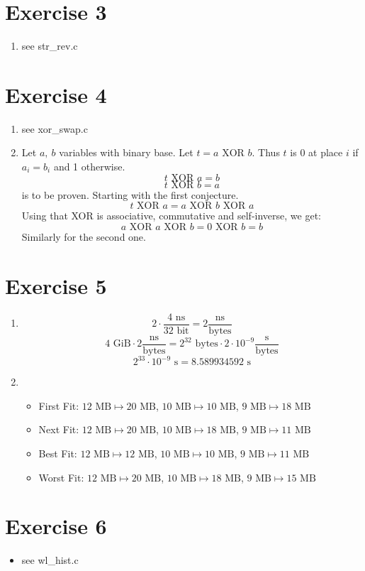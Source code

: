 \documentclass[a4paper,10pt]{article}
\begin{document}
\section*{Exercise 3}
\begin{enumerate}
 \item see str\_rev.c
\end{enumerate}

\section*{Exercise 4}
\begin{enumerate}
 \item see xor\_swap.c
 \item Let $a,\ b$ variables with binary base. Let $t = a \text{ XOR } b$. Thus $t$ is $0$ at place $i$ if $a_i = b_i$ and 1 otherwise. \\
 \[ t \text{ XOR } a = b \]
 \[ t \text{ XOR } b = a \]
 is to be proven. Starting with the first conjecture.
 \[ t \text{ XOR } a = a \text{ XOR } b \text{ XOR } a \]
 Using that XOR is associative, commutative and self-inverse, we get:
 \[ a \text{ XOR } a \text{ XOR } b  = 0 \text{ XOR } b = b \]
 Similarly for the second one.
\end{enumerate}


\section*{Exercise 5}
\begin{enumerate}
 \item \[ 2 \cdot \frac{4 \text{ ns}}{32 \text{ bit}} = 2 \frac{\text{ns}}{\text{bytes}} \]
 \[ 4 \text{ GiB} \cdot 2 \frac{\text{ns}}{\text{bytes}} = 2^{32} \text{ bytes} \cdot 2 \cdot 10^{-9}  \frac{\text{s}}{\text{bytes}} \]
 \[ 2^33 \cdot 10^{-9} \text{ s} = 8.589934592 \text{ s} \]
 \item 
 \begin{itemize}
  \item First Fit: $12 \text{ MB} \mapsto 20 \text{ MB}$, $10 \text{ MB} \mapsto 10 \text{ MB}$, $9 \text{ MB} \mapsto 18 \text{ MB}$ 
  \item Next Fit: $12 \text{ MB} \mapsto 20 \text{ MB}$, $10 \text{ MB} \mapsto 18 \text{ MB}$, $9 \text{ MB} \mapsto 11 \text{ MB}$ 
  \item Best Fit: $12 \text{ MB} \mapsto 12 \text{ MB}$, $10 \text{ MB} \mapsto 10 \text{ MB}$, $9 \text{ MB} \mapsto 11 \text{ MB}$ 
  \item Worst Fit: $12 \text{ MB} \mapsto 20 \text{ MB}$, $10 \text{ MB} \mapsto 18 \text{ MB}$, $9 \text{ MB} \mapsto 15 \text{ MB}$ 
 \end{itemize}

\end{enumerate}

\section*{Exercise 6}
\begin{itemize}
 \item see wl\_hist.c
\end{itemize}
\end{document}
